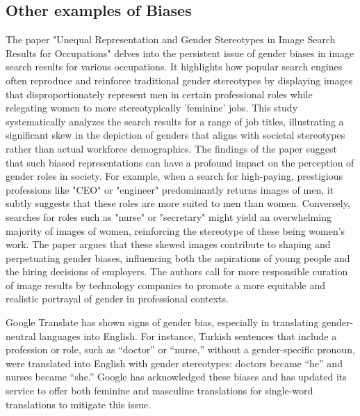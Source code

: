 \subsection{Other examples of Biases}
The paper "Unequal Representation and Gender Stereotypes in Image Search Results for Occupations" delves into the persistent issue of gender biases in image search results for various occupations. It highlights how popular search engines often reproduce and reinforce traditional gender stereotypes by displaying images that disproportionately represent men in certain professional roles while relegating women to more stereotypically 'feminine' jobs. This study systematically analyzes the search results for a range of job titles, illustrating a significant skew in the depiction of genders that aligns with societal stereotypes rather than actual workforce demographics. The findings of the paper suggest that such biased representations can have a profound impact on the perception of gender roles in society. For example, when a search for high-paying, prestigious professions like "CEO" or "engineer" predominantly returns images of men, it subtly suggests that these roles are more suited to men than women. Conversely, searches for roles such as "nurse" or "secretary" might yield an overwhelming majority of images of women, reinforcing the stereotype of these being women's work. The paper argues that these skewed images contribute to shaping and perpetuating gender biases, influencing both the aspirations of young people and the hiring decisions of employers. The authors call for more responsible curation of image results by technology companies to promote a more equitable and realistic portrayal of gender in professional contexts. \cite{Kay_Matuszek_Munson_2015}

Google Translate has shown signs of gender bias, especially in translating gender-neutral languages into English. For instance, Turkish sentences that include a profession or role, such as “doctor” or “nurse,” without a gender-specific pronoun, were translated into English with gender stereotypes: doctors became “he” and nurses became “she.” Google has acknowledged these biases and has updated its service to offer both feminine and masculine translations for single-word translations to mitigate this issue. \cite{Machine_Translation_Gendered_Innovations}

